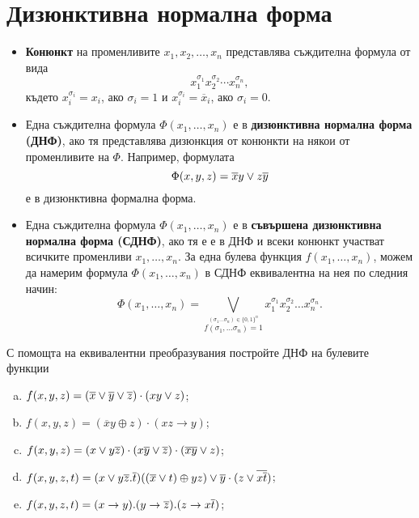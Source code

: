 \section{Дизюнктивна нормална форма}

\begin{itemize}
\item
  {\bf Конюнкт} на променливите $x_1,x_2,\dots,x_n$ представлява съждителна формула от вида 
  \[x^{\sigma_1}_1x^{\sigma_2}_2 \cdots x^{\sigma_n}_n,\]
  където $x^{\sigma_i}_i = x_i$, ако $\sigma_i = 1$ и $x^{\sigma_i}_i = \overline{x}_i$, ако $\sigma_i = 0$.
\item
  Една съждителна формула $\Phi(x_1,\dots,x_n)$ е в {\bf дизюнктивна нормална форма (ДНФ)}, ако
  тя представлява дизюнкция от конюнкти на някои от променливите на $\Phi$.
  Например, формулата 
  \[\Phi(x,y,z) = \overline{x}y \vee z\overline{y}\]
  е в дизюнктивна формална форма.
\item
  Една съждителна формула $\Phi(x_1,\dots,x_n)$ е в {\bf съвършена дизюнктивна нормална форма (СДНФ)}, ако
  тя е е в ДНФ и всеки конюнкт участват всичките променливи $x_1,\dots,x_n$.
  За една булева функция $f(x_1,\dots,x_n)$, можем да намерим формула $\Phi(x_1,\dots,x_n)$ в СДНФ еквивалентна на нея по следния начин:
  \[\Phi(x_1,\dots,x_n) = \bigvee_{\stackrel{(\sigma_1\dots \sigma_n) \in \{0,1\}^n}{f(\sigma_1, \dots \sigma_n) = 1}}x_1^{\sigma_1}x_2^{\sigma_2}\dots x_n^{\sigma_n}.\]
\end{itemize}

\begin{problem} %
  С помощта на еквивалентни преобразувания постройте ДНФ на булевите функции
  \begin{enumerate}[a)]
  \item
    $f(x,y,z) = (\overline{x}\vee\overline{y}\vee\overline{z})\cdot(xy\vee z)$;
  \item
    $f(x,y,z) = (\overline{x}y\oplus z)\cdot(xz\rightarrow y)$;
  \item
    $f(x,y,z) = (x\vee y\overline{z})\cdot(x\overline{y}\vee\overline{z})\cdot(\overline{xy}\vee z)$;
  \item
    $f(x,y,z,t) = (x\vee y\overline{z}.\overline{t})((\overline{x}\vee t)\oplus yz)\vee \overline{y}\cdot(z\vee \overline{x\overline{t}})$;
  \item
    $f(x,y,z,t) = (x\rightarrow y).(y\rightarrow \overline{z}).(z\rightarrow x\overline{t})$;
  \end{enumerate}
\end{problem}

